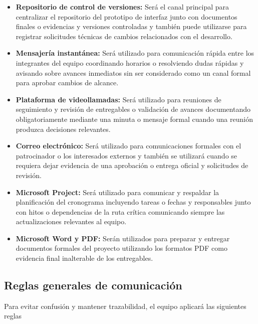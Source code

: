 \documentclass[11pt,spanish]{article}
\begin{document}
\begin{itemize}
    \item \textbf{Repositorio de control de versiones:} Será el canal principal para centralizar el repositorio del prototipo de interfaz junto con documentos finales o evidencias y versiones controladas y también puede utilizarse para registrar solicitudes técnicas de cambios relacionados con el desarrollo.
    \item \textbf{Mensajería instantánea:} Será utilizado para comunicación rápida entre los integrantes del equipo coordinando horarios o resolviendo dudas rápidas y avisando sobre avances inmediatos sin ser considerado como un canal formal para aprobar cambios de alcance.
    \item \textbf{Plataforma de videollamadas:} Será utilizado para reuniones de seguimiento y revisión de entregables o validación de avances documentando obligatoriamente mediante una minuta o mensaje formal cuando una reunión produzca decisiones relevantes.
    \item \textbf{Correo electrónico:} Será utilizado para comunicaciones formales con el patrocinador o los interesados externos y también se utilizará cuando se requiera dejar evidencia de una aprobación o entrega oficial y solicitudes de revisión.
    \item \textbf{Microsoft Project:} Será utilizado para comunicar y respaldar la planificación del cronograma incluyendo tareas o fechas y responsables junto con hitos o dependencias de la ruta crítica comunicando siempre las actualizaciones relevantes al equipo.
    \item \textbf{Microsoft Word y PDF:} Serán utilizados para preparar y entregar documentos formales del proyecto utilizando los formatos PDF como evidencia final inalterable de los entregables.
\end{itemize}

\subsection{Reglas generales de comunicación}

Para evitar confusión y mantener trazabilidad, el equipo aplicará las siguientes reglas
\end{document}
